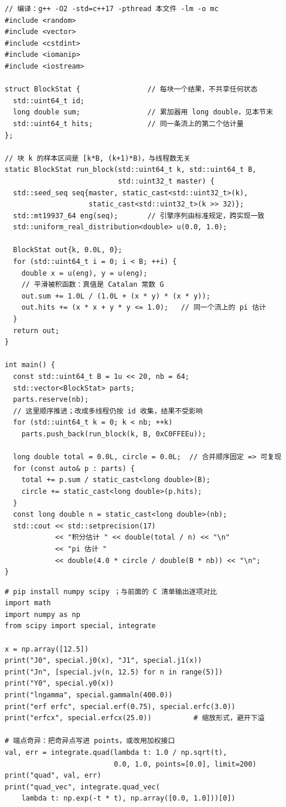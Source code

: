 \documentclass[12pt,a4paper,fontset=fandol]{ctexbook}
\newcommand{\Tp}[1]{\texttt{#1}}
\newcommand{\Lang}[1]{\textsf{\bfseries #1}}
\newcommand{\CPP}{\Lang{C++}}
\begin{document}
\begin{lstlisting}[style=cppstyle,caption={\CPP{}11 随机数做分块蒙特卡洛：每块一条派生流，合并顺序固定},label={lst:ch06-mc}]
// 编译：g++ -O2 -std=c++17 -pthread 本文件 -lm -o mc
#include <random>
#include <vector>
#include <cstdint>
#include <iomanip>
#include <iostream>

struct BlockStat {                // 每块一个结果，不共享任何状态
  std::uint64_t id;
  long double sum;                // 累加器用 long double，见本节末
  std::uint64_t hits;             // 同一条流上的第二个估计量
};

// 块 k 的样本区间是 [k*B, (k+1)*B)，与线程数无关
static BlockStat run_block(std::uint64_t k, std::uint64_t B,
                           std::uint32_t master) {
  std::seed_seq seq{master, static_cast<std::uint32_t>(k),
                    static_cast<std::uint32_t>(k >> 32)};
  std::mt19937_64 eng(seq);       // 引擎序列由标准规定，跨实现一致
  std::uniform_real_distribution<double> u(0.0, 1.0);

  BlockStat out{k, 0.0L, 0};
  for (std::uint64_t i = 0; i < B; ++i) {
    double x = u(eng), y = u(eng);
    // 平滑被积函数：真值是 Catalan 常数 G
    out.sum += 1.0L / (1.0L + (x * y) * (x * y));
    out.hits += (x * x + y * y <= 1.0);   // 同一个流上的 pi 估计
  }
  return out;
}

int main() {
  const std::uint64_t B = 1u << 20, nb = 64;
  std::vector<BlockStat> parts;
  parts.reserve(nb);
  // 这里顺序推进；改成多线程仍按 id 收集，结果不受影响
  for (std::uint64_t k = 0; k < nb; ++k)
    parts.push_back(run_block(k, B, 0xC0FFEEu));

  long double total = 0.0L, circle = 0.0L;  // 合并顺序固定 => 可复现
  for (const auto& p : parts) {
    total += p.sum / static_cast<long double>(B);
    circle += static_cast<long double>(p.hits);
  }
  const long double n = static_cast<long double>(nb);
  std::cout << std::setprecision(17)
            << "积分估计 " << double(total / n) << "\n"
            << "pi 估计 "
            << double(4.0 * circle / double(B * nb)) << "\n";
}
\end{lstlisting}

\begin{lstlisting}[style=pythonstyle,caption={\Tp{scipy.special} 与 \Tp{scipy.integrate} 的对拍：同一族算法，看的是差多少},label={lst:ch06-scipy}]
# pip install numpy scipy ；与前面的 C 清单输出逐项对比
import math
import numpy as np
from scipy import special, integrate

x = np.array([12.5])
print("J0", special.j0(x), "J1", special.j1(x))
print("Jn", [special.jv(n, 12.5) for n in range(5)])
print("Y0", special.y0(x))
print("lngamma", special.gammaln(400.0))
print("erf erfc", special.erf(0.75), special.erfc(3.0))
print("erfcx", special.erfcx(25.0))          # 缩放形式，避开下溢

# 端点奇异：把奇异点写进 points，或改用加权接口
val, err = integrate.quad(lambda t: 1.0 / np.sqrt(t),
                          0.0, 1.0, points=[0.0], limit=200)
print("quad", val, err)
print("quad_vec", integrate.quad_vec(
    lambda t: np.exp(-t * t), np.array([0.0, 1.0]))[0])
\end{lstlisting}
\end{document}
